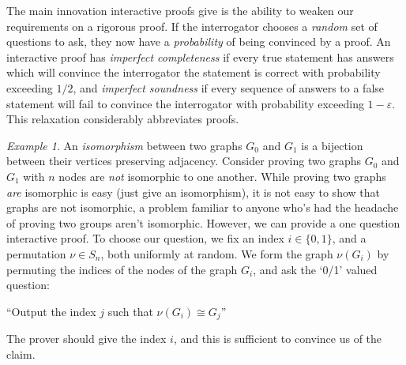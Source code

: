 \documentclass{article}
\theoremstyle{plain}
\theoremstyle{remark}
\newtheorem*{example}{Example}
\theoremstyle{definition}
\begin{document}
\begin{multicols}{2}
The main innovation interactive proofs give is the ability to weaken our requirements on a rigorous proof. If the interrogator chooses a {\it random} set of questions to ask, they now have a {\it probability} of being convinced by a proof. An interactive proof has {\it imperfect completeness} if every true statement has answers which will convince the interrogator the statement is correct with probability exceeding $1/2$, and {\it imperfect soundness} if every sequence of answers to a false statement will fail to convince the interrogator with probability exceeding $1 - \varepsilon$. This relaxation considerably abbreviates proofs.

\begin{example}
    An {\it isomorphism} between two graphs $G_0$ and $G_1$ is a bijection between their vertices preserving adjacency. Consider proving two graphs $G_0$ and $G_1$ with $n$ nodes are {\it not} isomorphic to one another. While proving two graphs {\it are} isomorphic is easy (just give an isomorphism), it is not easy to show that graphs are not isomorphic, a problem familiar to anyone who's had the headache of proving two groups aren't isomorphic. However, we can provide a one question interactive proof. To choose our question, we fix an index $i \in \{ 0, 1 \}$, and a permutation $\nu \in S_n$, both uniformly at random. We form the graph $\nu(G_i)$ by permuting the indices of the nodes of the graph $G_i$, and ask the `0/1' valued question:
%
\begin{center}
    ``Output the index $j$ such that $\nu(G_i) \cong G_j$''
\end{center}
%
The prover should give the index $i$, and this is sufficient to convince us of the claim.

\begin{center}
\end{center}
\end{example}
\end{multicols}
\end{document}
